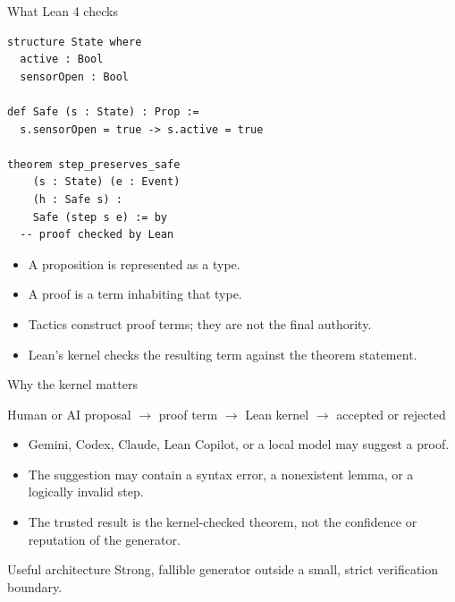 \documentclass[aspectratio=169,10pt]{beamer}
\begin{document}
\begin{frame}[fragile]{What Lean 4 checks}
  \begin{lstlisting}
structure State where
  active : Bool
  sensorOpen : Bool

def Safe (s : State) : Prop :=
  s.sensorOpen = true -> s.active = true

theorem step_preserves_safe
    (s : State) (e : Event)
    (h : Safe s) :
    Safe (step s e) := by
  -- proof checked by Lean
  \end{lstlisting}

  \begin{itemize}
    \item A proposition is represented as a type.
    \item A proof is a term inhabiting that type.
    \item Tactics construct proof terms; they are not the final authority.
    \item Lean's kernel checks the resulting term against the theorem statement.
  \end{itemize}
\end{frame}

\begin{frame}{Why the kernel matters}
  \begin{center}
    \Large
    Human or AI proposal
    $\longrightarrow$
    proof term
    $\longrightarrow$
    \alert{Lean kernel}
    $\longrightarrow$
    accepted or rejected
  \end{center}

  \vspace{1em}
  \begin{itemize}
    \item Gemini, Codex, Claude, Lean Copilot, or a local model may suggest a proof.
    \item The suggestion may contain a syntax error, a nonexistent lemma, or a
          logically invalid step.
    \item The trusted result is the kernel-checked theorem, not the confidence
          or reputation of the generator.
  \end{itemize}

  \begin{block}{Useful architecture}
    Strong, fallible generator outside a small, strict verification boundary.
  \end{block}
\end{frame}
\end{document}
